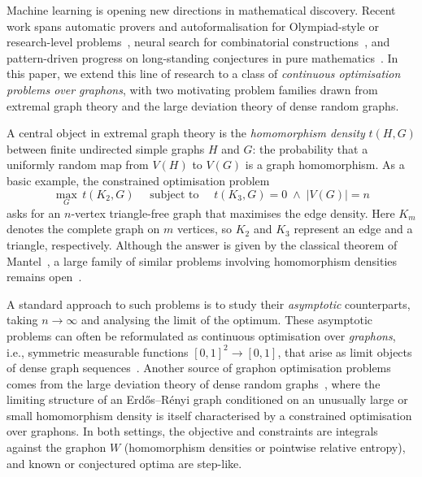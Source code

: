 \documentclass[11pt]{article}
\theoremstyle{plain}
\theoremstyle{definition}
\theoremstyle{remark}
\begin{document}
Machine learning is opening new directions in mathematical discovery. Recent work spans automatic provers and autoformalisation for Olympiad-style or research-level problems~\citep{polu2023formal, trinh2024solving, jiang2023draft, wu2022autoformalization, hubert2026olympiad, huang2025winning,alexeev2026primitive}, neural search for combinatorial constructions~\citep{wagner2021constructions, charton2024patternboost, romera2024mathematical, novikov2025alphaevolve}, and pattern-driven progress on long-standing conjectures in pure mathematics~\citep{davies2021advancing, he2025murmurations}. In this paper, we extend this line of research to a class of \emph{continuous optimisation problems over graphons}, with two motivating problem families drawn from extremal graph theory and the large deviation theory of dense random graphs.

A central object in extremal graph theory is the \emph{homomorphism density} $t(H, G)$ between finite undirected simple graphs $H$ and $G$: the probability that a uniformly random map from $V(H)$ to $V(G)$ is a graph homomorphism. As a basic example, the constrained optimisation problem
\begin{equation}
  \max_G\, t(K_2, G)
  \quad\text{ subject to }\quad
  t(K_3, G) = 0 \;\land\; |V(G)| = n
  \label{eqn:mantel}
\end{equation}
asks for an $n$-vertex triangle-free graph that maximises the edge density. Here $K_m$ denotes the complete graph on $m$ vertices, so
$K_2$ and $K_3$ represent an edge and a triangle, respectively. Although the answer is given by the classical theorem of Mantel~\citep{mantel1907vraagstuk}, a large family of similar problems involving homomorphism densities remains open~\citep{sidorenko1993correlation, borgs2006counting}.

A standard approach to such problems is to study their \emph{asymptotic} counterparts, taking $n \to \infty$ and analysing the limit of the optimum. These asymptotic problems can often be reformulated as continuous optimisation over \emph{graphons}, i.e., symmetric measurable functions $[0,1]^2 \to [0,1]$, that arise as limit objects of dense graph sequences~\citep{lovasz2006limits, lovasz2012large}. Another source of graphon optimisation problems comes from the large deviation theory of dense random graphs~\citep{chatterjee2011large}, where the limiting structure of an Erd\H{o}s--R\'enyi graph conditioned on an unusually large or small homomorphism density is itself characterised by a constrained optimisation over graphons. In both settings, the objective and constraints are integrals against the graphon $W$ (homomorphism densities or pointwise relative entropy), and known or conjectured optima are step-like.
\end{document}
